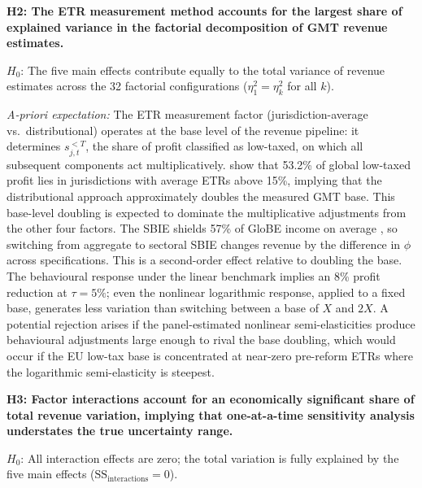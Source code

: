 \documentclass[11pt,a4paper]{article}
\begin{document}
\textbf{H2: The ETR measurement method accounts for the largest share of explained variance in the factorial decomposition of GMT revenue estimates.}

$H_0$: The five main effects contribute equally to the total variance of revenue estimates across the 32 factorial configurations ($\eta_1^2 = \eta_k^2$ for all $k$).

\textit{A-priori expectation:} The ETR measurement factor (jurisdiction-average vs.\ distributional) operates at the base level of the revenue pipeline: it determines $s_{j,t}^{<T}$, the share of profit classified as low-taxed, on which all subsequent components act multiplicatively. \citet{hugger2026} show that 53.2\% of global low-taxed profit lies in jurisdictions with average ETRs above 15\%, implying that the distributional approach approximately doubles the measured GMT base. This base-level doubling is expected to dominate the multiplicative adjustments from the other four factors. The SBIE shields 57\% of GloBE income on average \citep{devereux2023}, so switching from aggregate to sectoral SBIE changes revenue by the difference in $\phi$ across specifications. This is a second-order effect relative to doubling the base. The behavioural response under the linear benchmark implies an 8\% profit reduction at $\tau = 5\%$; even the nonlinear logarithmic response, applied to a fixed base, generates less variation than switching between a base of $X$ and $2X$. A potential rejection arises if the panel-estimated nonlinear semi-elasticities produce behavioural adjustments large enough to rival the base doubling, which would occur if the EU low-tax base is concentrated at near-zero pre-reform ETRs where the logarithmic semi-elasticity is steepest.

\textbf{H3: Factor interactions account for an economically significant share of total revenue variation, implying that one-at-a-time sensitivity analysis understates the true uncertainty range.}

$H_0$: All interaction effects are zero; the total variation is fully explained by the five main effects ($\text{SS}_{\text{interactions}} = 0$).
\end{document}
